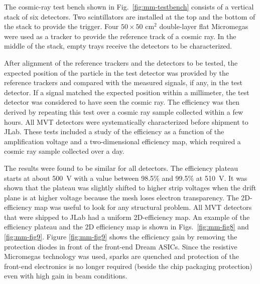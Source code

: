 The cosmic-ray test bench shown in Fig.~\ref{fig:mm-testbench} consists of a vertical stack of six detectors. Two scintillators
are installed at the top and the bottom of the stack to provide the trigger. Four $50 \times 50 \text{ cm}^2$ double-layer flat
Micromegas were used as a tracker to provide the reference track of a cosmic ray. In the middle of the stack, empty trays
receive the detectors to be characterized.

After alignment of the reference trackers and the detectors to be tested, the expected position of the particle in the test
detector was provided by the reference trackers and compared with the measured signals, if any, in the test detector. If a
signal matched the expected position within a millimeter, the test detector was considered to have seen the cosmic ray. The
efficiency was then derived by repeating this test over a cosmic ray sample collected within a few hours. All MVT detectors
were systematically characterized before shipment to JLab. These tests included a study of the efficiency as a function of
the amplification voltage and a two-dimensional efficiency map, which required a cosmic ray sample collected over a day.

The results were found to be similar for all detectors. The efficiency plateau starts at about 500~V with a value between
98.5\% and 99.5\% at 510~V. It was shown that the plateau was slightly shifted to higher strip voltages when the drift plane
is at higher voltage because the mesh loses electron transparency. The 2D-efficiency map was useful to look for any structural
problem. All MVT detectors that were shipped to JLab had a uniform 2D-efficiency map. An example of the efficiency plateau
and the 2D efficiency map is shown in Figs.~\ref{fig:mm-fig8} and \ref{fig:mm-fig9}. Figure \ref{fig:mm-fig9} shows the
efficiency gain by removing the protection diodes in front of the front-end Dream ASICs. Since the resistive Micromegas
technology was used, sparks are quenched and protection of the front-end electronics is no longer required (beside the chip
packaging protection) even with high gain in beam conditions.

